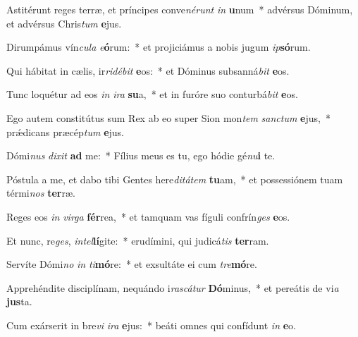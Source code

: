\item Astitérunt reges terræ, et príncipes conve\textit{né}\textit{runt} \textit{in} \textbf{u}num~* advérsus Dóminum, et advérsus Chris\textit{tum} \textbf{e}jus.
\item Dirumpámus vín\textit{cu}\textit{la} \textit{e}\textbf{ó}rum:~* et projiciámus a nobis jugum \textit{ip}\textbf{só}rum.
\item Qui hábitat in cælis, ir\textit{ri}\textit{dé}\textit{bit} \textbf{e}os:~* et Dóminus subsanná\textit{bit} \textbf{e}os.
\item Tunc loquétur ad eos \textit{in} \textit{i}\textit{ra} \textbf{su}a,~* et in furóre suo conturbá\textit{bit} \textbf{e}os.
\item Ego autem constitútus sum Rex ab eo super Sion mon\textit{tem} \textit{sanc}\textit{tum} \textbf{e}jus,~* prǽdicans præcép\textit{tum} \textbf{e}jus.
\item Dómi\textit{nus} \textit{di}\textit{xit} \textbf{ad} me:~* Fílius meus es tu, ego hódie gé\textit{nu}\textbf{i} te.
\item Póstula a me, et dabo tibi Gentes here\textit{di}\textit{tá}\textit{tem} \textbf{tu}am,~* et possessiónem tuam térmi\textit{nos} \textbf{ter}ræ.
\item Reges eos \textit{in} \textit{vir}\textit{ga} \textbf{fér}rea,~* et tamquam vas fíguli confrín\textit{ges} \textbf{e}os.
\item Et nunc, re\textit{ges}, \textit{in}\textit{tel}\textbf{lí}gite:~* erudímini, qui judicá\textit{tis} \textbf{ter}ram.
\item Servíte Dómi\textit{no} \textit{in} \textit{ti}\textbf{mó}re:~* et exsultáte ei cum \textit{tre}\textbf{mó}re.
\item Apprehéndite disciplínam, nequándo i\textit{ras}\textit{cá}\textit{tur} \textbf{Dó}minus,~* et pereátis de vi\textit{a} \textbf{jus}ta.
\item Cum exárserit in bre\textit{vi} \textit{i}\textit{ra} \textbf{e}jus:~* beáti omnes qui confídunt \textit{in} \textbf{e}o.
